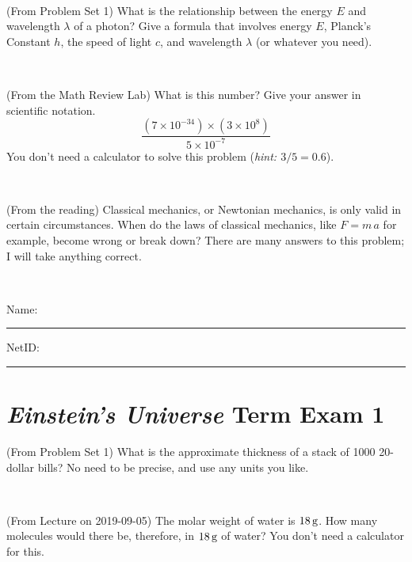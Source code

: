 \documentclass[12pt, letterpaper]{article}
\begin{document}
\vfill ~

\begin{problem} (From Problem Set 1)
What is the relationship between the energy $E$ and wavelength
$\lambda$ of a photon? Give a formula that involves energy $E$,
Planck's Constant $h$, the speed of light $c$, and wavelength
$\lambda$ (or whatever you need).
\end{problem}

\vfill ~

\begin{problem} (From the Math Review Lab)
What is this number? Give your answer in scientific notation.
$$
\frac{(7\times10^{-34})\times(3\times10^8)}{5\times10^{-7}}
$$
You don't need a calculator to solve this problem (\textit{hint: $3/5=0.6$}).
\end{problem}


\vfill ~

\begin{problem} (From the reading)
Classical mechanics, or Newtonian mechanics, is only valid in certain
circumstances. When do the laws of classical mechanics, like $F =
m\,a$ for example, become wrong or break down? There are many answers
to this problem; I will take anything correct.
\end{problem}


\vfill ~


\cleardoublepage



\noindent
Name: \rule[-1ex]{0.60\textwidth}{0.1pt}
NetID: \rule[-1ex]{0.20\textwidth}{0.1pt}

\section*{\textsl{Einstein's Universe} Term Exam 1}
\setcounter{problem}{1}


\begin{problem} (From Problem Set 1)
What is the approximate thickness of a stack of 1000 20-dollar bills?
No need to be precise, and use any units you like.
\end{problem}


\vfill ~

\begin{problem} (From Lecture on 2019-09-05)
The molar weight of water is $18\,\mathrm{g}$. How many molecules would there
be, therefore, in $18\,\mathrm{g}$ of water? You don't need a calculator for
this.
\end{problem}


\vfill ~
\end{document}
